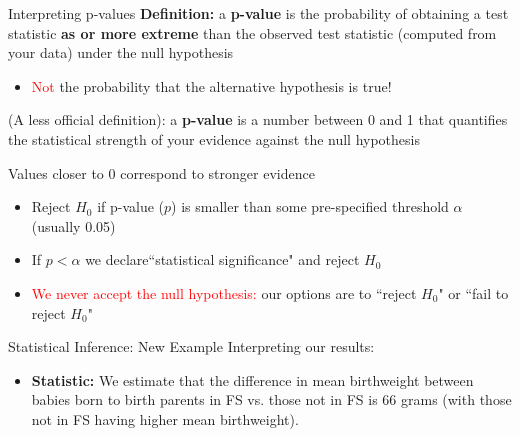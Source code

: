 \documentclass[10pt,t]{beamer}
\begin{document}
\begin{frame}{Interpreting p-values}
\textbf{Definition:} a \textbf{p-value} is the probability of obtaining a test statistic \textbf{as or more extreme} than the observed test statistic (computed from your data) under the null hypothesis

\begin{itemize}
	\item[] \textcolor{red}{Not} the probability that the alternative hypothesis is true! 
\end{itemize}

\vspace{0.3cm} 

(A less official definition): a \textbf{p-value} is a number between 0 and 1 that quantifies the statistical strength of your evidence against the null hypothesis

\vspace{0.3cm}

Values closer to 0 correspond to stronger evidence
\begin{itemize}
	\item Reject $H_0$ if p-value ($p$) is smaller than some pre-specified threshold $\alpha$ (usually 0.05)
	\item If $p < \alpha$ we declare``statistical significance" and reject $H_0$
	\item \textcolor{red}{We never accept the null hypothesis:} our options are to ``reject $H_0$" or ``fail to reject $H_0$"
\end{itemize}

\end{frame}

\begin{frame}{Statistical Inference: New Example}
Interpreting our results:

\vspace{0.3cm}

\begin{itemize}
	\item \textbf{Statistic:} We estimate that the difference in mean birthweight between babies born to birth parents in FS vs. those not in FS is 66 grams (with those not in FS having higher mean birthweight).
\end{itemize}

\end{frame}
\end{document}
